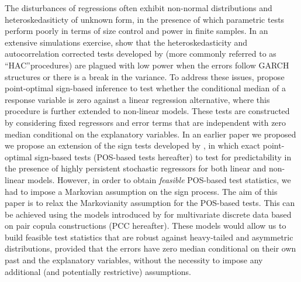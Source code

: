 \documentclass[harvard,11pt]{article}
\begin{document}
 The disturbances of regressions often exhibit non-normal distributions and heteroskedasiticty of unknown form, in the presence of which parametric tests perform poorly in terms of size control and power in finite samples. In an extensive simulations exercise, \citet{dufour2010exact} show that the heteroskedasticity and autocorrelation corrected tests developed by \citet{white1980heteroskedasticity} (more commonly referred to as \textquotedblleft HAC\textquotedblright procedures) are plagued with low power when the errors follow GARCH structures or there is a break in the variance. To address these issues, \citet{dufour2010exact} propose point-optimal sign-based inference to test whether the conditional median of a response variable is zero against a linear regression alternative, where this procedure is further extended to non-linear models. These tests are constructed by considering fixed regressors and error terms that are independent with zero median conditional on the explanatory variables. In an earlier paper we proposed we propose an extension of the sign tests developed by \citet{dufour2010exact}, in which exact point-optimal sign-based tests (POS-based tests hereafter) to test for predictability in the presence of highly persistent stochastic regressors for both  linear and non-linear models. However, in order to obtain \textit{feasible} POS-based test statistics, we had to impose a Markovian assumption on the sign process. The aim of this paper is to relax the Markovianity assumption for the POS-based tests. This can be achieved using the models introduced by \citet{panagiotelis2012pair} for multivariate discrete data based on pair copula constructions (PCC hereafter). These models would allow us to build feasible test statistics that are robust against heavy-tailed and asymmetric distributions, provided that the errors have zero median conditional on their own past and the explanatory variables, without the necessity to impose any additional (and potentially restrictive) assumptions.
\end{document}
